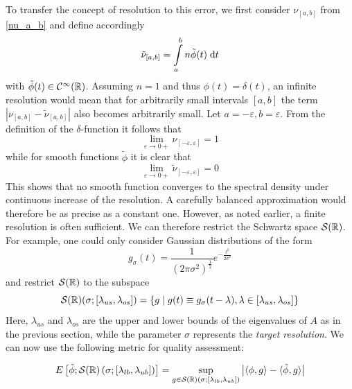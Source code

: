 To transfer the concept of resolution to this error,
we first consider $\nu_{[a, b]}$ from \eqref{nu_a_b} and define accordingly
\[
\tilde{\nu}_{[a, b]} = \int\limits_a^b n \tilde{\phi}(t) \;\mathrm{d}t
\]
with $\tilde{\phi}(t) \in \mathcal{C}^{\infty}(\mathbb{R})$.
Assuming $n = 1$ and thus $\phi(t) = \delta(t)$,
an infinite resolution would mean that for arbitrarily small intervals $[a, b]$ the term $\left| \nu_{[a, b]} - \tilde{\nu}_{[a, b]} \right|$ also becomes arbitrarily small.
Let $a = -\varepsilon, b = \varepsilon$.
From the definition of the $\delta$-function it follows that
$$\lim \limits_{\varepsilon \to 0+} \nu_{[-\varepsilon, \varepsilon]} = 1$$
while for smooth functions $\tilde{\phi}$ it is clear that
$$\lim \limits_{\varepsilon \to 0+} \tilde{\nu}_{[-\varepsilon, \varepsilon]} = 0$$
This shows that no smooth function converges to the spectral density under continuous increase of the resolution.
A carefully balanced approximation would therefore be as precise as a constant one.
However, as noted earlier,
a finite resolution is often sufficient.
We can therefore restrict the Schwartz space $\mathcal{S}(\mathbb{R})$.
For example, one could only consider Gaussian distributions of the form
$$g_{\sigma}(t) = \frac{1}{(2\pi\sigma^2)^\frac{1}{2}}e^{-\frac{t^2}{2\sigma^2}}$$
and restrict $\mathcal{S}(\mathbb{R})$ to the subspace
$$\mathcal{S}(\mathbb{R})(\sigma;[\lambda_{us}, \lambda_{os}]) = \left\{ g \mid g(t) \equiv g_{\sigma}(t - \lambda), \lambda \in [\lambda_{us}, \lambda_{os}] \right\}$$
Here, $\lambda_{us}$ and $\lambda_{os}$ are the upper and lower bounds of the eigenvalues of $A$ as in the previous section,
while the parameter $\sigma$ represents the \emph{target resolution}.
We can now use the following metric for quality assessment:

\begin{equation} \label{eq:error}
    E\left[\tilde{\phi};\mathcal{S}(\mathbb{R})\left(\sigma; \left[\lambda_{lb}, \lambda_{ub} \right] \right)\right] = \sup_{g \in \mathcal{S}(\mathbb{R})(\sigma;[\lambda_{lb}, \lambda_{ub}])} \left| \langle \phi, g \rangle - \langle \tilde{\phi}, g \rangle \right|
\end{equation}

